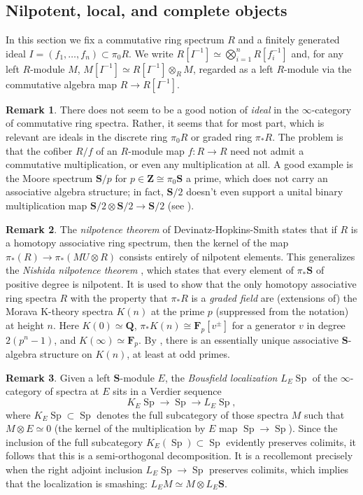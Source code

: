 \documentclass[12pt]{article}
\theoremstyle{definition}
\newtheorem{remark}{Remark}[subsection]
\newcommand{\FF}{\mathbf{F}}
\newcommand{\QQ}{\mathbf{Q}}
\renewcommand{\SS}{\mathbf{S}}
\newcommand{\ZZ}{\mathbf{Z}}
\renewcommand{\i}{\infty}
\newcommand{\too}{\longrightarrow}
\DeclareMathOperator{\Sp}{Sp}
\begin{document}
\subsection{Nilpotent, local, and complete objects}
In this section we fix a commutative ring spectrum $R$ and a finitely generated ideal $I=(f_1,\ldots,f_n)\subset\pi_0 R$.
We write $R[I^{-1}]\simeq\bigotimes_{i=1}^n R[f_i^{-1}]$ and, for any left $R$-module $M$, $M[I^{-1}]\simeq  R[I^{-1}]\otimes_R M$, regarded as a left $R$-module via the commutative algebra map $R\to R[I^{-1}]$.
\begin{remark}
There does not seem to be a good notion of {\em ideal} in the $\i$-category of commutative ring spectra.
Rather, it seems that for most part, which is relevant are ideals in the discrete ring $\pi_0 R$ or graded ring $\pi_* R$.
The problem is that the cofiber $R/f$ of an $R$-module map $f:R\to R$ need not admit a commutative multiplication, or even any multiplication at all.
A good example is the Moore spectrum $\SS/p$ for $p\in\ZZ\cong\pi_0\SS$ a prime, which does not carry an associative algebra structure; in fact, $\SS/2$ doesn't even support a unital binary multiplication map $\SS/2\otimes\SS/2\to\SS/2$ (see \cite[Proposition 4]{Sc10}).
\end{remark}

\begin{remark}
The {\em nilpotence theorem} of Devinatz-Hopkins-Smith \cite{DHS} states that if $R$ is a homotopy associative ring spectrum, then the kernel of the map $\pi_*(R)\to\pi_*(MU\otimes R)$ consists entirely of nilpotent elements.
This generalizes the {\em Nishida nilpotence theorem} \cite{Ni73}, which states that every element of $\pi_*\SS$ of positive degree is nilpotent.
It is used to show that  the only homotopy associative ring spectra $R$ with the property that $\pi_* R$ is a {\em graded field} are (extensions of) the Morava K-theory spectra $K(n)$ at the prime $p$ (suppressed from the notation) at height $n$.
Here $K(0)\simeq\QQ$,  $\pi_* K(n)\cong\FF_p[v^{\pm}]$ for a generator $v$ in degree $2(p^n-1)$, and $K(\infty)\simeq\FF_p$.
By \cite{An11}, there is an essentially unique associative $\SS$-algebra structure on $K(n)$, at least at odd primes.
\end{remark}

\begin{remark}
Given a left $\SS$-module $E$, the {\em Bousfield localization} $L_E\Sp$ of the $\i$-category of spectra at $E$ sits in a Verdier sequence
\[
K_E\Sp\too\Sp\too L_E\Sp,
\]
where $K_E\Sp\subset\Sp$ denotes the full subcategory of those spectra $M$ such that $M\otimes E\simeq 0$ (the kernel of the multiplication by $E$ map $\Sp\to\Sp$).
Since the inclusion of the full subcategory $K_E(\Sp)\subset\Sp$ evidently preserves colimits, it follows that this is a semi-orthogonal decomposition.
It is a recollemont precisely when the right adjoint inclusion $L_E\Sp\to\Sp$ preserves colimits, which implies that the localization is smashing: $L_E M\simeq M\otimes L_E\SS$.
\end{remark}
\end{document}
